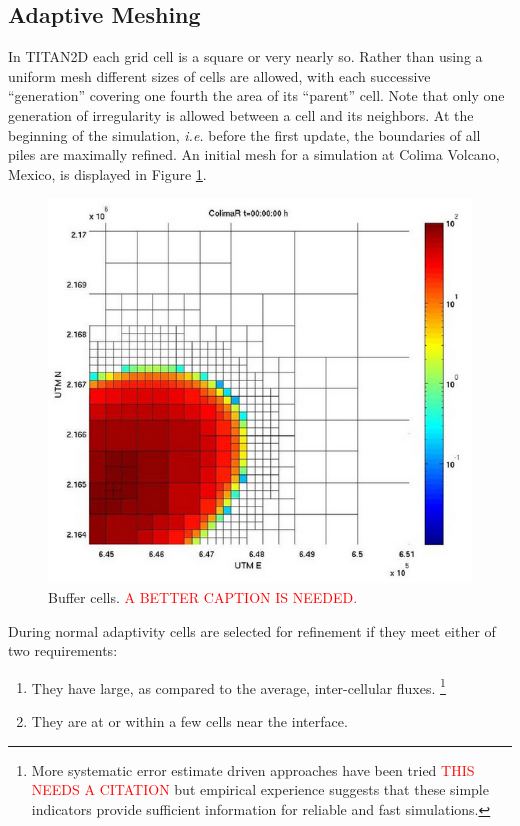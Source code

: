 \documentclass[letterpaper,10pt]{article}
\newcommand{\red}[1]{\textcolor{red}{#1}}
\begin{document}
\subsection{Adaptive Meshing} \label{adaptivemeshing}
In TITAN2D each grid cell is a square or very nearly so. Rather than 
using a uniform mesh different sizes of cells are allowed, with each 
successive ``generation'' covering one fourth the area of its ``parent'' 
cell.  Note that only one generation of irregularity is allowed between 
a cell and its neighbors.
At the beginning of the simulation, \textit{i.e.} before the first update, the 
boundaries of all piles are maximally refined. An initial mesh for a 
simulation at Colima Volcano, Mexico, is displayed in Figure \ref{bufcell}. 
\begin{figure}[!h]
        \begin{center}
                \includegraphics[scale=.3]{IMAGES/buffercells.png}
                \caption{Buffer cells. \red{A BETTER CAPTION IS NEEDED.}}
                \label{bufcell}
        \end{center}
\end{figure} 
During normal adaptivity cells are selected for refinement if they meet 
either of two requirements:
\begin{enumerate} 
        \item They have large, as compared to the average, inter-cellular fluxes. \footnote{More systematic error estimate driven approaches have been tried \red{THIS NEEDS A CITATION}\cite{} but 
        empirical experience suggests that these simple indicators provide sufficient information for reliable and fast simulations.}
        \item They are at or within a few cells near the interface.
\end{enumerate}
\end{document}
